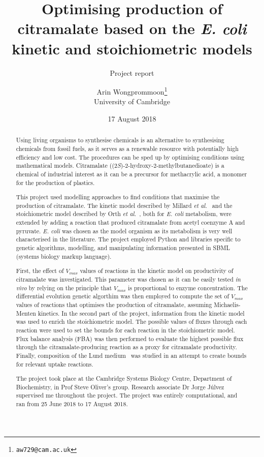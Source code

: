 \documentclass[parskip=full, numbers=noenddot]{scrreprt}
\author{Arin Wongprommoon\thanks{\texttt{aw729@cam.ac.uk}} \\University of Cambridge}
\title{Optimising production of citramalate based on the \emph{E. coli} kinetic and stoichiometric models}
\subtitle{Project report}
\date{17 August 2018}
\begin{document}
\maketitle

\tableofcontents

\begin{abstract}
  Using living organisms to synthesise chemicals is an alternative to synthesising chemicals from fossil fuels, as it serves as a renewable resource with potentially high efficiency and low cost. The procedures can be sped up by optimising conditions using mathematical models. Citramalate ((2\emph{S})-2-hydroxy-2-methylbutanedioate) is a chemical of industrial interest as it can be a precursor for methacrylic acid, a monomer for the production of plastics. 
  
  This project used modelling approaches to find conditions that maximise the production of citramalate. The kinetic model described by Millard \emph{et al.}~\cite{millard_metabolic_2017} and the stoichiometric model described by Orth \emph{et al.}~\cite{orth_comprehensive_2011}, both for \emph{E. coli} metabolism, were extended by adding a reaction that produced citramalate from acetyl coenzyme A and pyruvate. \emph{E. coli} was chosen as the model organism as its metabolism is very well characterised in the literature. The project employed Python and libraries specific to genetic algorithms, modelling, and manipulating information presented in SBML (systems biology markup language).
  
  First, the effect of $V_{max}$ values of reactions in the kinetic model on productivity of citramalate was investigated. This parameter was chosen as it can be easily tested \emph{in vivo} by relying on the principle that $V_{max}$ is proportional to enzyme concentration. The differential evolution genetic algorthim was then employed to compute the set of $V_{max}$ values of reactions that optimises the production of citramalate, assuming Michaelis-Menten kinetics. In the second part of the project, information from the kinetic model was used to enrich the stoichiometric model. The possible values of fluxes through each reaction were used to set the bounds for each reaction in the stoichiometric model. Flux balance analysis (FBA) was then performed to evaluate the highest possible flux through the citramalate-producing reaction as a proxy for citramalate productivity. Finally, composition of the Lund medium~\cite{eastham_process_2015} was studied in an attempt to create bounds for relevant uptake reactions.
  
  The project took place at the Cambridge Systems Biology Centre, Department of Biochemistry, in Prof Steve Oliver's group. Research associate Dr Jorge J\'ulvez supervised me throughout the project. The project was entirely computational, and ran from 25 June 2018 to 17 August 2018.
\end{abstract}
\end{document}
